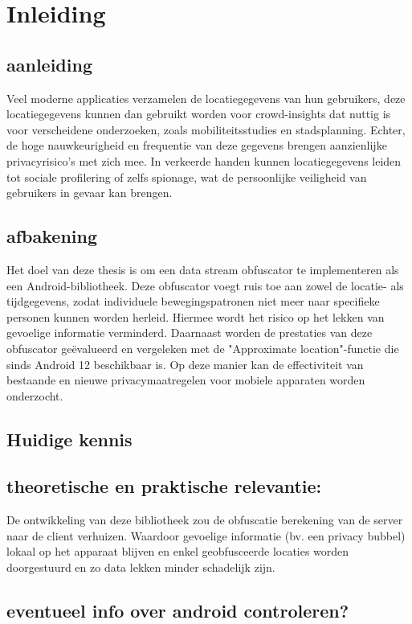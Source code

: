 \section*{Inleiding}
\subsection*{aanleiding}
Veel moderne applicaties verzamelen de locatiegegevens van hun gebruikers, deze locatiegegevens kunnen dan gebruikt worden voor crowd-insights dat nuttig is voor verscheidene onderzoeken, zoals mobiliteitsstudies en stadsplanning. Echter, de hoge nauwkeurigheid en frequentie van deze gegevens brengen aanzienlijke privacyrisico’s met zich mee. In verkeerde handen kunnen locatiegegevens leiden tot sociale profilering of zelfs spionage, wat de persoonlijke veiligheid van gebruikers in gevaar kan brengen.
\subsection*{afbakening}
Het doel van deze thesis is om een data stream obfuscator te implementeren als een Android-bibliotheek. Deze obfuscator voegt ruis toe aan zowel de locatie- als tijdgegevens, zodat individuele bewegingspatronen niet meer naar specifieke personen kunnen worden herleid. Hiermee wordt het risico op het lekken van gevoelige informatie verminderd. Daarnaast worden de prestaties van deze obfuscator geëvalueerd en vergeleken met de "Approximate location"-functie die sinds Android 12 beschikbaar is. Op deze manier kan de effectiviteit van bestaande en nieuwe privacymaatregelen voor mobiele apparaten worden onderzocht.
\subsection*{Huidige kennis}
\subsection*{theoretische en praktische relevantie:}
De ontwikkeling van deze bibliotheek zou de obfuscatie berekening van de server naar de client verhuizen. Waardoor gevoelige informatie (bv. een privacy bubbel) lokaal op het apparaat blijven en enkel geobfusceerde locaties worden doorgestuurd en zo data lekken minder schadelijk zijn.
\subsection*{eventueel info over android controleren?}
